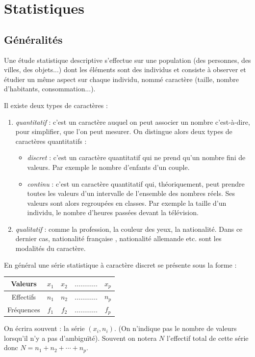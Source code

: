 \documentclass[french]{book}
\begin{document}
\tableofcontents
\chapter{Statistiques}
\section{G\'en\'eralit\'es}
Une \'etude statistique descriptive s'effectue sur une population (des personnes, des villes, des objets...) dont les \'el\'ements sont des individus et consiste à observer et \'etudier un m\^eme aspect sur chaque individu, nomm\'e caract\`ere (taille, nombre d'habitants, consommation...).

Il existe deux types de caract\`eres :
\begin{enumerate}
\item[$\bullet$]   \textit{quantitatif} : c'est un caract\`ere auquel on peut associer un nombre c'est-à-dire, pour simplifier, que l'on peut mesurer. On distingue alors deux types de caract\`eres quantitatifs :
 \begin{itemize}
 \item   \textit{discret} : c'est un caract\`ere quantitatif qui ne prend qu'un nombre fini de valeurs. Par exemple le nombre d'enfants d'un couple.
 \item  \textit{continu} : c'est un caract\`ere quantitatif qui, th\'eoriquement, peut prendre toutes les valeurs d'un intervalle de l'ensemble des nombres r\'eels. Ses valeurs sont alors regroup\'ees en classes. Par exemple la taille d'un individu, le nombre d'heures pass\'ees devant la t\'el\'evision.
 \end{itemize}
\item[$\bullet$]  \textit{qualitatif} : comme la profession, la couleur des yeux, la nationalit\'e. Dans ce dernier cas, \og nationalit\'e française \fg, \og nationalit\'e allemande \fg{} etc. sont les modalit\'es du caract\`ere.
\end{enumerate}
En g\'en\'eral une s\'erie statistique à caract\`ere discret se pr\'esente sous la forme :
	\begin{center}
	\begin{tabular}{|c|c|c|p{2cm}|c|}
			\hline
			Valeurs & $x_{1}$ & $x_{2}$ & $\ldots\ldots\ldots\ldots$ & $x_{p}$  \\
			\hline
			Effectifs & $n_{1}$ & $n_{2}$ & $\ldots\ldots\ldots\ldots$ & $n_{p}$  \\
			\hline
			Fr\'equences & $f_{1}$ & $f_{2}$ & $\ldots\ldots\ldots\ldots$ & $f_{p}$  \\
			\hline
	\end{tabular}
	\end{center}
On \'ecrira souvent : la s\'erie $(x_{i},n_{i})$. (On n'indique pas le nombre de valeurs lorsqu'il n'y a pas d'ambiguït\'e). Souvent on notera $N$ l'effectif total de cette s\'erie donc $N=n_{1}+n_{2}+ \cdots +n_{p}$.
\end{document}
